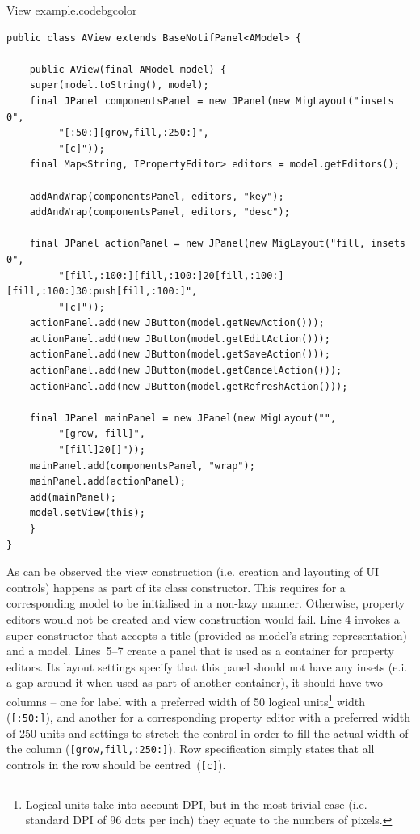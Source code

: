     \begin{code}{View example.}{\label{lst:view_example}}{codebgcolor}
    \begin{lstlisting}
public class AView extends BaseNotifPanel<AModel> {    

    public AView(final AModel model) {
	super(model.toString(), model);
	final JPanel componentsPanel = new JPanel(new MigLayout("insets 0", 
	     "[:50:][grow,fill,:250:]", 
	     "[c]"));
	final Map<String, IPropertyEditor> editors = model.getEditors();

	addAndWrap(componentsPanel, editors, "key");
	addAndWrap(componentsPanel, editors, "desc");

	final JPanel actionPanel = new JPanel(new MigLayout("fill, insets 0", 
	     "[fill,:100:][fill,:100:]20[fill,:100:][fill,:100:]30:push[fill,:100:]", 
	     "[c]"));
	actionPanel.add(new JButton(model.getNewAction()));
	actionPanel.add(new JButton(model.getEditAction()));
	actionPanel.add(new JButton(model.getSaveAction()));
	actionPanel.add(new JButton(model.getCancelAction()));
	actionPanel.add(new JButton(model.getRefreshAction()));

	final JPanel mainPanel = new JPanel(new MigLayout("", 
	     "[grow, fill]", 
	     "[fill]20[]"));
	mainPanel.add(componentsPanel, "wrap");
	mainPanel.add(actionPanel);
	add(mainPanel);
	model.setView(this);
    }
}
    \end{lstlisting}
  \end{code}
  
  As can be observed the view construction (i.e. creation and layouting of UI controls) happens as part of its class constructor.
  This requires for a corresponding model to be initialised in a non-lazy manner.
  Otherwise, property editors would not be created and view construction would fail.
  Line 4 invokes a super constructor that accepts a title (provided as model's string representation) and a model.
  Lines~5--7 create a panel that is used as a container for property editors.
  Its layout settings specify that this panel should not have any insets (e.i. a gap around it when used as part of another container), it should have two columns -- one for label with a preferred width of 50 logical units\footnote{Logical units take into account DPI, but in the most trivial case (i.e. standard DPI of 96 dots per inch) they equate to the numbers of pixels.} width (\texttt{[:50:]}), and another for a corresponding property editor with a preferred width of 250 units and settings to stretch the control in order to fill the actual width of the column (\texttt{[grow,fill,:250:]}).
  Row specification simply states that all controls in the row should be centred~(\texttt{[c]}).
  
